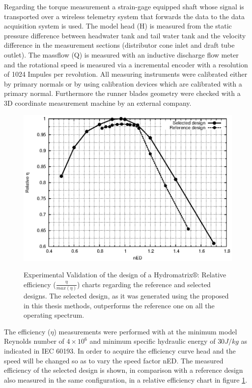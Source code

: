 Regarding the torque measurement a strain-gage equipped shaft whose signal is transported over a wireless telemetry system that forwards the data to the data acquisition system is used. The model head (H) is measured from the static pressure difference between headwater tank and tail water tank and the velocity difference in the measurement sections (distributor cone inlet and draft tube outlet). The massflow (Q) is measured with an inductive discharge flow meter and the rotational speed is measured via a incremental encoder with a resolution of 1024 Impules per revolution. All measuring instruments were calibrated either by primary normals or by using calibration devices which are calibrated with a primary normal. Furthermore the runner blades geometry were checked with a 3D coordinate measurement machine by an external company.

\begin{figure}[h!]
\centering
\resizebox*{13.0cm}{!}
{\includegraphics[width=1\textwidth]{./3obj6/Eff.eps}}
\caption{Experimental Validation of the design of a Hydromatrix$\circledR$: Relative efficiency ($\frac{\eta}{max(\eta)}$) charts regarding the reference and selected designs. The selected design, as it was generated using the proposed in this thesis methods, outperforms the reference one on all the operating spectrum.}
\label{exp.eff}
\end{figure}


The efficiency ($\eta$) measurements were performed with at the minimum model Reynolds number of $4 × 10^6$ and minimum specific hydraulic energy of $30J/kg$ as indicated in IEC 60193.
In order to acquire the efficiency curve head and the speed will be changed so as to vary the speed factor nED.  The measured efficiency of the selected design is shown, in comparison with a reference design also measured in the same configuration, in a relative efficiency chart in figure \ref{exp.eff}.    


